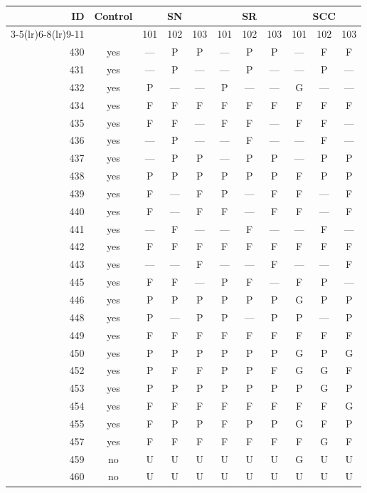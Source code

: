 \begin{table}[p]\centering\small
\begin{tabular*}{\textwidth}{@{\extracolsep{\fill}}rc*{9}{c}@{}}\toprule
ID & Control & \multicolumn{3}{c}{SN} & \multicolumn{3}{c}{SR} & \multicolumn{3}{c}{SCC}\\
\cmidrule(lr){3-5}\cmidrule(lr){6-8}\cmidrule(lr){9-11}
 & & 101 & 102 & 103 & 101 & 102 & 103 & 101 & 102 & 103\\\midrule
430 & yes & — & P & P & — & P & P & — & F & F\\
431 & yes & — & P & — & — & P & — & — & P & —\\
432 & yes & P & — & — & P & — & — & G & — & —\\
434 & yes & F & F & F & F & F & F & F & F & F\\
435 & yes & F & F & — & F & F & — & F & F & —\\
436 & yes & — & P & — & — & F & — & — & F & —\\
437 & yes & — & P & P & — & P & P & — & P & P\\
438 & yes & P & P & P & P & P & P & F & P & P\\
439 & yes & F & — & F & P & — & F & F & — & F\\
440 & yes & F & — & F & F & — & F & F & — & F\\
441 & yes & — & F & — & — & F & — & — & F & —\\
442 & yes & F & F & F & F & F & F & F & F & F\\
443 & yes & — & — & F & — & — & F & — & — & F\\
445 & yes & F & F & — & P & F & — & F & P & —\\
446 & yes & P & P & P & P & P & P & G & P & P\\
448 & yes & P & — & P & P & — & P & P & — & P\\
449 & yes & F & F & F & F & F & F & F & F & F\\
450 & yes & P & P & P & P & P & P & G & P & G\\
452 & yes & P & F & F & P & P & F & G & G & F\\
453 & yes & P & P & P & P & P & P & P & G & P\\
454 & yes & F & F & F & F & F & F & F & F & G\\
455 & yes & F & P & P & F & P & P & G & F & P\\
457 & yes & F & F & F & F & F & F & F & G & F\\
459 & no & U & U & U & U & U & U & G & U & U\\
460 & no & U & U & U & U & U & U & U & U & U\\

\end{tabular*}
\end{table}
